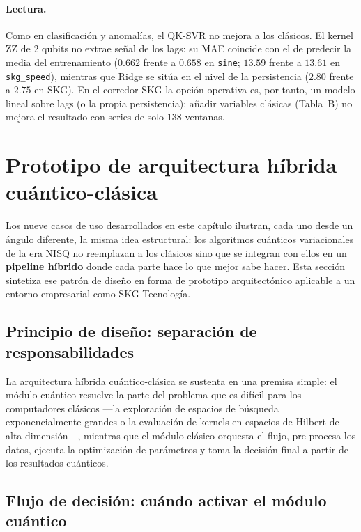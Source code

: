 \paragraph{Lectura.}
Como en clasificación y anomalías, el QK-SVR no mejora a los clásicos. El kernel ZZ de 2 qubits no extrae señal de los lags: su MAE coincide con el de predecir la media del entrenamiento ($0.662$ frente a $0.658$ en \texttt{sine}; $13.59$ frente a $13.61$ en \texttt{skg\_speed}), mientras que Ridge se sitúa en el nivel de la persistencia ($2.80$ frente a $2.75$ en SKG). En el corredor SKG la opción operativa es, por tanto, un modelo lineal sobre lags (o la propia persistencia); añadir variables clásicas (Tabla~B) no mejora el resultado con series de solo 138 ventanas.

\section{Prototipo de arquitectura híbrida cuántico-clásica}
\label{sec:prototipo_hibrido}

Los nueve casos de uso desarrollados en este capítulo ilustran, cada uno desde un ángulo diferente, la misma idea estructural: los algoritmos cuánticos variacionales de la era NISQ no reemplazan a los clásicos sino que se integran con ellos en un \textbf{pipeline híbrido} donde cada parte hace lo que mejor sabe hacer. Esta sección sintetiza ese patrón de diseño en forma de prototipo arquitectónico aplicable a un entorno empresarial como SKG Tecnología.

\subsection{Principio de diseño: separación de responsabilidades}

La arquitectura híbrida cuántico-clásica se sustenta en una premisa simple: el módulo cuántico resuelve la parte del problema que es difícil para los computadores clásicos —la exploración de espacios de búsqueda exponencialmente grandes o la evaluación de kernels en espacios de Hilbert de alta dimensión—, mientras que el módulo clásico orquesta el flujo, pre-procesa los datos, ejecuta la optimización de parámetros y toma la decisión final a partir de los resultados cuánticos.

\subsection{Flujo de decisión: cuándo activar el módulo cuántico}

